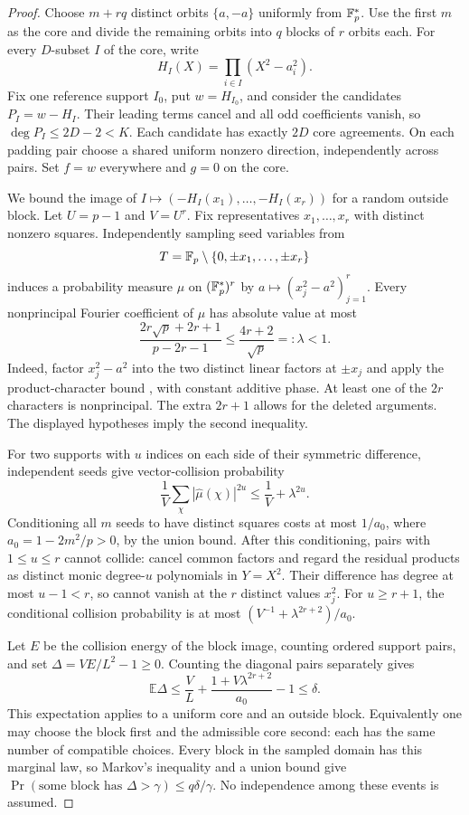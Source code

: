 \begin{proof}
Choose $m+rq$ distinct orbits $\{a,-a\}$ uniformly from $\mathbb F_p^*$.
Use the first $m$ as the core and divide the remaining orbits into
$q$ blocks of $r$ orbits each. For every $D$-subset $I$ of the core,
write
\[
 H_I(X)=\prod_{i\in I}(X^2-a_i^2).
\]
Fix one reference support $I_0$, put $w=H_{I_0}$, and consider the
candidates $P_I=w-H_I$. Their leading terms cancel and all odd
coefficients vanish, so $\deg P_I\le2D-2<K$. Each candidate has
exactly $2D$ core agreements. On each padding pair choose a shared
uniform nonzero direction, independently across pairs. Set $f=w$
everywhere and $g=0$ on the core.

We bound the image of $I\mapsto(-H_I(x_1),\ldots,-H_I(x_r))$ for a
random outside block. Let $U=p-1$ and $V=U^r$. Fix representatives
$x_1,\ldots,x_r$ with distinct nonzero squares. Independently sampling
seed variables from
\[
 T=\mathbb F_p\setminus\{0,\pm x_1,\ldots,\pm x_r\}
\]
induces a probability measure $\mu$ on $(\mathbb F_p^*)^r$ by
$a\mapsto(x_j^2-a^2)_{j=1}^r$. Every nonprincipal Fourier coefficient
of $\mu$ has absolute value at most
\[
 \frac{2r\sqrt p+2r+1}{p-2r-1}
 \le \frac{4r+2}{\sqrt p}=:\lambda<1.
\]
Indeed, factor $x_j^2-a^2$ into the two distinct linear factors at
$\pm x_j$ and apply the product-character bound
\cite[Lemma 17]{bgks-shifted}, with constant additive phase. At least
one of the $2r$ characters is nonprincipal. The extra $2r+1$ allows
for the deleted arguments. The displayed hypotheses imply the second
inequality.

For two supports with $u$ indices on each side of their symmetric
difference, independent seeds give vector-collision probability
\[
 \frac1V\sum_{\chi}|\widehat\mu(\chi)|^{2u}
 \le \frac1V+\lambda^{2u}.
\]
Conditioning all $m$ seeds to have distinct squares costs at most
$1/a_0$, where $a_0=1-2m^2/p>0$, by the union bound.
After this conditioning, pairs with $1\le u\le r$ cannot collide:
cancel common factors and regard the residual products as distinct
monic degree-$u$ polynomials in $Y=X^2$. Their difference has degree
at most $u-1<r$, so cannot vanish at the $r$ distinct values $x_j^2$.
For $u\ge r+1$, the conditional collision probability is at most
$(V^{-1}+\lambda^{2r+2})/a_0$.

Let $E$ be the collision energy of the block image, counting ordered
support pairs, and set $\Delta=VE/L^2-1\ge0$. Counting the diagonal
pairs separately gives
\[
 \mathbb E\Delta\le\frac VL+
 \frac{1+V\lambda^{2r+2}}{a_0}-1\le\delta.
\]
This expectation applies to a uniform core and an outside block.
Equivalently one may choose the block first and the admissible core
second: each has the same number of compatible choices. Every block
in the sampled domain has this marginal law, so Markov's inequality
and a union bound give
$\Pr(\text{some block has }\Delta>\gamma)\le q\delta/\gamma$.
No independence among these events is assumed.


\end{proof}
